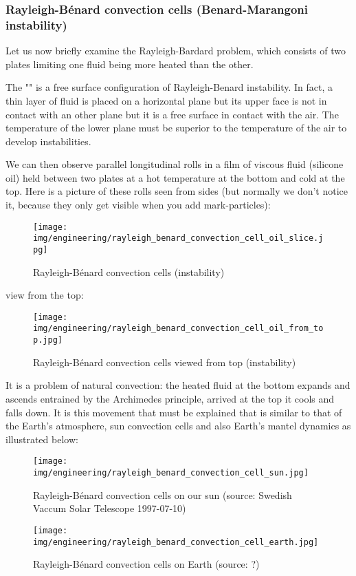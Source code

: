 	\subsubsection{Rayleigh-Bénard convection cells (Benard-Marangoni instability)}
	Let us now briefly examine the Rayleigh-Bardard problem, which consists of two plates limiting one fluid being more heated than the other.
	\begin{tcolorbox}[title=Remark,colframe=black,arc=10pt]
	The "" is a free surface configuration of Rayleigh-Benard instability. In fact, a thin layer of fluid is placed on a horizontal plane but its upper face is not in contact with an other plane but it is a free surface in contact with the air. The temperature of the lower plane must be superior to the temperature of the air to develop instabilities.
	\end{tcolorbox}
	We can then observe parallel longitudinal rolls in a film of viscous fluid (silicone oil) held between two plates at a hot temperature at the bottom and cold at the top. Here is a picture of these rolls seen from sides (but normally we don't notice it, because they only get visible when you add mark-particles):
	\begin{figure}[H]
		\centering
		\texttt{[image: img/engineering/rayleigh\_benard\_convection\_cell\_oil\_slice.jpg]}	
		\caption{Rayleigh-Bénard convection cells (instability)}
	\end{figure}
	view from the top:
	\begin{figure}[H]
		\centering
		\texttt{[image: img/engineering/rayleigh\_benard\_convection\_cell\_oil\_from\_top.jpg]}	
		\caption{Rayleigh-Bénard convection cells viewed from top (instability)}
	\end{figure}
	It is a problem of natural convection: the heated fluid at the bottom expands and ascends entrained by the Archimedes principle, arrived at the top it cools and falls down. It is this movement that must be explained that is similar to that of the Earth's atmosphere, sun convection cells and also Earth's mantel dynamics as illustrated below:
	\begin{figure}[H]
		\centering
		\texttt{[image: img/engineering/rayleigh\_benard\_convection\_cell\_sun.jpg]}	
		\caption{Rayleigh-Bénard convection cells on our sun (source: Swedish Vaccum Solar Telescope 1997-07-10)}
	\end{figure}
	\begin{figure}[H]
		\centering
		\texttt{[image: img/engineering/rayleigh\_benard\_convection\_cell\_earth.jpg]}	
		\caption{Rayleigh-Bénard convection cells on Earth (source: ?)}
	\end{figure}
